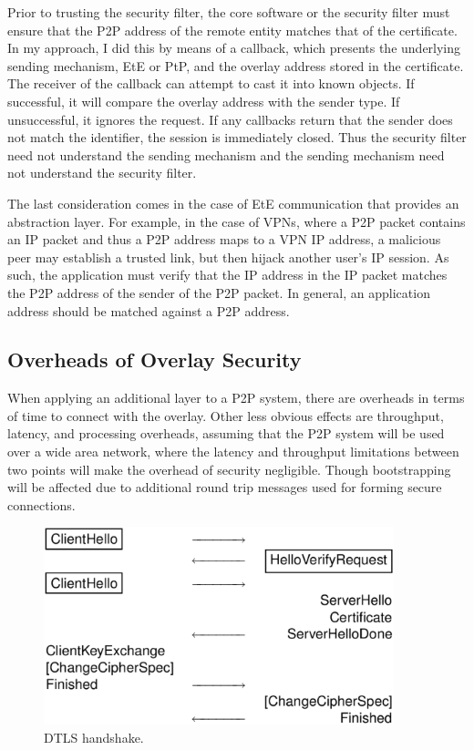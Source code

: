 Prior to trusting the security filter, the core software or the security filter
must ensure that the P2P address of the remote entity matches that of the
certificate.  In my approach, I did this by means of a callback, which presents
the underlying sending mechanism, EtE or PtP, and the overlay address stored in
the certificate.  The receiver of the callback can attempt to cast it into
known objects. If successful, it will compare the overlay address with the
sender type.  If unsuccessful, it ignores the request.  If any callbacks return
that the sender does not match the identifier, the session is immediately
closed.  Thus the security filter need not understand the sending mechanism and
the sending mechanism need not understand the security filter.

The last consideration comes in the case of EtE communication that provides an
abstraction layer.  For example, in the case of VPNs, where a P2P packet
contains an IP packet and thus a P2P address maps to a VPN IP address, a
malicious peer may establish a trusted link, but then hijack another user's IP
session.  As such, the application must verify that the IP address in the IP
packet matches the P2P address of the sender of the P2P packet.  In general, an
application address should be matched against a P2P address.

\subsection{Overheads of Overlay Security}

When applying an additional layer to a P2P system, there are overheads in terms
of time to connect with the overlay.  Other less obvious effects are
throughput, latency, and processing overheads, assuming that the P2P system
will be used over a wide area network, where the latency and throughput
limitations between two points will make the overhead of security negligible.
Though bootstrapping will be affected due to additional round trip messages
used for forming secure connections.

\begin{figure}[ht]
\centering
\includegraphics[width=4in]{figs/dtls.eps}
\caption{DTLS handshake.}
\label{fig:dtls}
\end{figure}

